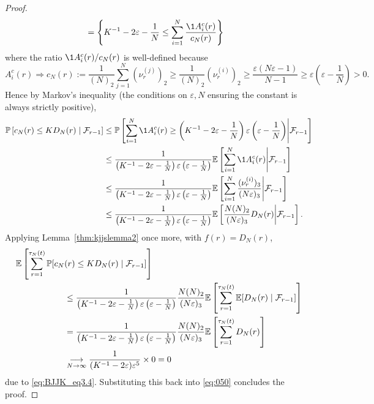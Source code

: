 \begin{proof}
\begin{align*}
&=\left\{ K^{-1} - 2\varepsilon- \frac{1}{N} \leq 
        \sum_{i=1}^N \frac{ \1{A_i^c(r)} }{ c_N(r) } \right\} 
\end{align*}
where the ratio $\1{A_i^c(r)} / c_N(r)$ is well-defined because
\begin{equation*}
A_i^c(r) 
\Rightarrow c_N(r) 
:= \frac{1}{(N)_2} \sum_{j=1}^N (\nu_r^{(j)})_2
\geq \frac{1}{(N)_2} (\nu_r^{(i)})_2
\geq \frac{\varepsilon (N\varepsilon-1)}{N-1}
\geq \varepsilon \left( \varepsilon - \frac{1}{N} \right)
>0 .
\end{equation*}
Hence by Markov's inequality (the conditions on $\varepsilon, N$ ensuring the constant is always strictly positive),
\begin{align*}
\Prob\left[ c_N(r) \leq K D_N(r) \mid \mathcal{F}_{r-1} \right]
&\leq \Prob\left[ \sum_{i=1}^N \1{A_i^c(r)} \geq 
        \left( K^{-1} - 2\varepsilon- \frac{1}{N} \right) \varepsilon 
        \left( \varepsilon-\frac{1}{N} \right) 
        \middle| \mathcal{F}_{r-1} \right] \\
&\leq \frac{1}{\left( K^{-1} - 2\varepsilon- \frac{1}{N} \right) \varepsilon 
        \left( \varepsilon-\frac{1}{N} \right)} 
        \E\left[ \sum_{i=1}^N \1{A_i^c(r)} 
        \middle| \mathcal{F}_{r-1} \right] \\
&\leq \frac{1}{\left( K^{-1} - 2\varepsilon- \frac{1}{N} \right) \varepsilon 
        \left( \varepsilon-\frac{1}{N} \right)} 
        \E\left[ \sum_{i=1}^N \frac{(\nu_r^{(i)})_3}{(N\varepsilon)_3}
        \middle| \mathcal{F}_{r-1} \right] \\
&\leq \frac{1}{\left( K^{-1} - 2\varepsilon- \frac{1}{N} \right) \varepsilon 
        \left( \varepsilon-\frac{1}{N} \right)} 
        \E\left[ \frac{N(N)_2}{(N\varepsilon)_3} D_N(r)
        \middle| \mathcal{F}_{r-1} \right] .
\end{align*}
Applying Lemma~\ref{thm:kjjslemma2} once more, with $f(r) = D_N(r)$,
\begin{align*}
&\mathbb{E} \left[ \sum_{r=1}^{\tau_N(t)} \mathbb{P}[ c_N(r) \leq K D_N(r) 
        \mid \mathcal{F}_{r-1} ] \right] \\
&\hspace{2cm}\leq \frac{1}{\left( K^{-1} - 2\varepsilon- \frac{1}{N} \right) \varepsilon 
        \left( \varepsilon-\frac{1}{N} \right)} \frac{N(N)_2}{(N\varepsilon)_3}
        \mathbb{E}\left[ \sum_{r=1}^{\tau_N(t)} \mathbb{E}[ D_N(r) 
        \mid \mathcal{F}_{r-1} ] \right] \\
&\hspace{2cm}= \frac{1}{\left( K^{-1} - 2\varepsilon- \frac{1}{N} \right) \varepsilon 
        \left( \varepsilon-\frac{1}{N} \right)} \frac{N(N)_2}{(N\varepsilon)_3}
        \mathbb{E}\left[ \sum_{r=1}^{\tau_N(t)} D_N(r) \right] \\
&\hspace{2cm}\underset{N\to\infty}{\longrightarrow} 
        \frac{1}{(K^{-1} - 2\varepsilon)\varepsilon^5} \times0
=0
\end{align*}
due to \eqref{eq:BJJK_eq3.4}.
Substituting this back into \eqref{eq:050} concludes the proof.
\end{proof}


